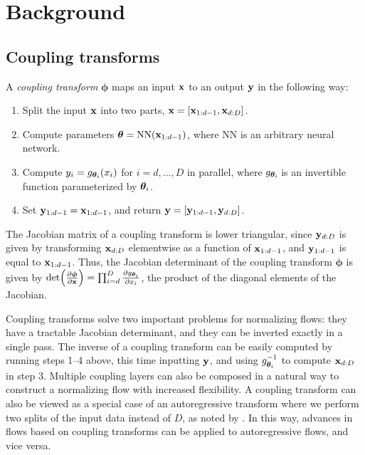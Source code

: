 \section{Background}

\subsection{Coupling transforms}

A \emph{coupling transform} $\bm{\phi}$ \citep{Dinh:2015:nice} maps an input $ \mathbf{x} $ to an output $ \mathbf{y} $ in the following way: 
\begin{enumerate}[topsep=0pt, itemsep=1pt]
    \item Split the input $ \mathbf{x} $ into two parts, $ \mathbf{x} = \mathopen{}\left[\mathbf{x}_{1:d-1}, \mathbf{x}_{d:D}\right]\mathclose{} $.
    \item Compute parameters $ \bm{\theta} = \text{NN}(\mathbf{x}_{1:d-1}) $, where NN is an arbitrary neural network. 
    \item Compute $ y_i = g_{\bm{\theta}_i}(x_i) $ for $i=d,\dots,D$ in parallel, where $g_{\bm{\theta}_i}\!$ is an invertible function parameterized by $ \bm{\theta}_i $.
    \item Set $ \mathbf{y}_{1:d-1} = \mathbf{x}_{1:d-1} $, and return $ \mathbf{y} = \mathopen{}\left[\mathbf{y}_{1:d-1}, \mathbf{y}_{d:D}\right]\mathclose{} $.
\end{enumerate}
The Jacobian matrix of a coupling transform is lower triangular, since $ \mathbf{y}_{d:D} $ is given by transforming $ \mathbf{x}_{d:D} $ elementwise as a function of $ \mathbf{x}_{1:d-1} $, and $ \mathbf{y}_{1:d-1} $ is equal to $ \mathbf{x}_{1:d-1} $. 
Thus, the Jacobian determinant of the coupling transform $\bm{\phi}$ is given by 
$\det\mathopen{}\left(\frac{\partial\bm{\phi}}{\partial\mathbf{x}}\right)\mathclose{}   = \prod_{i=d}^{D} \frac{\partial g_{\bm{\theta}_i}}{\partial x_i}$, the product of the diagonal elements of the Jacobian.

Coupling transforms solve two important problems for normalizing flows: they have a tractable Jacobian determinant, and they can be inverted exactly in a single pass. 
The inverse of a coupling transform can be easily computed by running steps 1--4 above, this time inputting $ \mathbf{y} $, and using $g_{\bm{\theta}_i}^{-1} $ to compute $ \mathbf{x}_{d:D} $ in step 3. 
Multiple coupling layers can also be composed in a natural way to construct a normalizing flow with increased flexibility. A coupling transform can also be viewed as a special case of an autoregressive transform where we perform two splits of the input data instead of $ D $, as noted by \citet{Papamakarios:2017:maf}. In this way, advances in flows based on coupling transforms can be applied to autoregressive flows, and vice versa.

